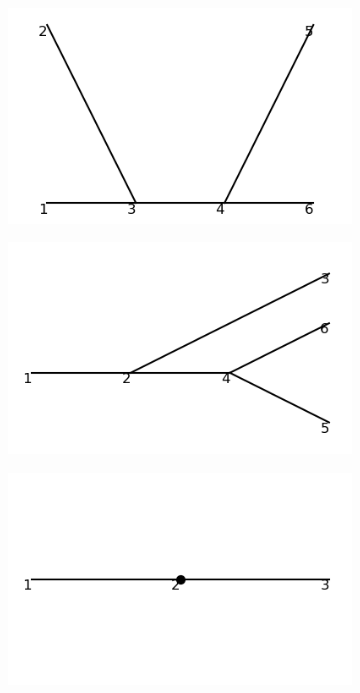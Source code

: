 \documentclass[11pt,a4paper,twoside,pdf]{article}
\numberwithin{equation}{section}
\begin{document}
\begin{figure}[h!]
\begin{subfigure}[t]{0.24\textwidth}
        \caption{ }
        \label{fig:order2_from_order1/3}
    \end{subfigure}
    \hfill
    \begin{subfigure}[t]{0.24\textwidth}
        \centering
        \includegraphics[width=\textwidth]{plots/order2/from_order1/4.png}
        \caption{ }
        \label{fig:order2_from_order1/4}
    \end{subfigure}
    \hfill
    \begin{subfigure}[t]{0.24\textwidth}
        \centering
        \includegraphics[width=\textwidth]{plots/order2/from_order1/5.png}
        \caption{ }
        \label{fig:order2_from_order1/5}
    \end{subfigure}
    \begin{subfigure}[t]{0.24\textwidth}
        \centering
        \includegraphics[width=\textwidth]{plots/order2/from_order1/counterterms/1.png}

\end{subfigure}
\end{figure}
\end{document}
